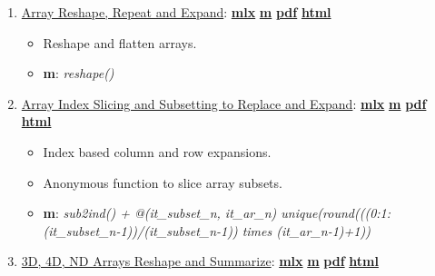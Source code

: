 \documentclass[
]{book}
\providecommand{\tightlist}{%
  \setlength{\itemsep}{0pt}\setlength{\parskip}{0pt}}
\begin{document}
\begin{enumerate}
\def\labelenumi{\arabic{enumi}.}
\tightlist
\item
  \href{https://fanwangecon.github.io/M4Econ/amto/array/htmlpdfm/fs_reshape.html}{Array Reshape, Repeat and Expand}: \href{https://github.com/FanWangEcon/M4Econ/blob/master/amto/array/fs_reshape.mlx}{\textbf{mlx}} \textbar{} \href{https://github.com/FanWangEcon/M4Econ/blob/master/amto/array/htmlpdfm/fs_reshape.m}{\textbf{m}} \textbar{} \href{https://github.com/FanWangEcon/M4Econ/blob/master/amto/array/htmlpdfm/fs_reshape.pdf}{\textbf{pdf}} \textbar{} \href{https://fanwangecon.github.io/M4Econ/amto/array/htmlpdfm/fs_reshape.html}{\textbf{html}}

  \begin{itemize}
  \tightlist
  \item
    Reshape and flatten arrays.
  \item
    \textbf{m}: \emph{reshape()}
  \end{itemize}
\item
  \href{https://fanwangecon.github.io/M4Econ/amto/array/htmlpdfm/fs_slicing.html}{Array Index Slicing and Subsetting to Replace and Expand}: \href{https://github.com/FanWangEcon/M4Econ/blob/master/amto/array/fs_slicing.mlx}{\textbf{mlx}} \textbar{} \href{https://github.com/FanWangEcon/M4Econ/blob/master/amto/array/htmlpdfm/fs_slicing.m}{\textbf{m}} \textbar{} \href{https://github.com/FanWangEcon/M4Econ/blob/master/amto/array/htmlpdfm/fs_slicing.pdf}{\textbf{pdf}} \textbar{} \href{https://fanwangecon.github.io/M4Econ/amto/array/htmlpdfm/fs_slicing.html}{\textbf{html}}

  \begin{itemize}
  \tightlist
  \item
    Index based column and row expansions.
  \item
    Anonymous function to slice array subsets.
  \item
    \textbf{m}: \emph{sub2ind() + @(it\_subset\_n, it\_ar\_n) unique(round(((0:1:(it\_subset\_n-1))/(it\_subset\_n-1)) times (it\_ar\_n-1)+1))}
  \end{itemize}
\item
  \href{https://fanwangecon.github.io/M4Econ/amto/array/htmlpdfm/fs_3d4dndarray.html}{3D, 4D, ND Arrays Reshape and Summarize}: \href{https://github.com/FanWangEcon/M4Econ/blob/master/amto/array/fs_3d4dndarray.mlx}{\textbf{mlx}} \textbar{} \href{https://github.com/FanWangEcon/M4Econ/blob/master/amto/array/htmlpdfm/fs_3d4dndarray.m}{\textbf{m}} \textbar{} \href{https://github.com/FanWangEcon/M4Econ/blob/master/amto/array/htmlpdfm/fs_3d4dndarray.pdf}{\textbf{pdf}} \textbar{} \href{https://fanwangecon.github.io/M4Econ/amto/array/htmlpdfm/fs_3d4dndarray.html}{\textbf{html}}


\end{enumerate}
\end{document}
